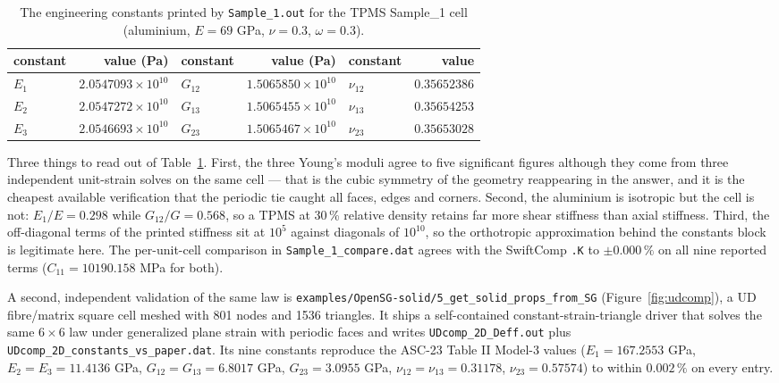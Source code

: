 \begin{table}[htbp]
\centering
\caption{The engineering constants printed by \texttt{Sample\_1.out} for the
TPMS Sample\_1 cell (aluminium, $E = 69$ GPa, $\nu = 0.3$, $\omega = 0.3$).}
\label{tab:tpmsconst}
\small
\begin{tabular}{lrlrlr}
\toprule
constant & value (Pa) & constant & value (Pa) & constant & value \\
\midrule
$E_1$ & $2.0547093\times10^{10}$ & $G_{12}$ & $1.5065850\times10^{10}$ & $\nu_{12}$ & $0.35652386$ \\
$E_2$ & $2.0547272\times10^{10}$ & $G_{13}$ & $1.5065455\times10^{10}$ & $\nu_{13}$ & $0.35654253$ \\
$E_3$ & $2.0546693\times10^{10}$ & $G_{23}$ & $1.5065467\times10^{10}$ & $\nu_{23}$ & $0.35653028$ \\
\bottomrule
\end{tabular}
\end{table}

Three things to read out of Table~\ref{tab:tpmsconst}. First, the three Young's
moduli agree to five significant figures although they come from three
independent unit-strain solves on the same cell --- that is the cubic symmetry
of the geometry reappearing in the answer, and it is the cheapest available
verification that the periodic tie caught all faces, edges and corners.
Second, the aluminium is isotropic but the cell is not: $E_1/E = 0.298$ while
$G_{12}/G = 0.568$, so a TPMS at 30\,\% relative density retains far more shear
stiffness than axial stiffness. Third, the off-diagonal terms of the printed
stiffness sit at $10^{5}$ against diagonals of $10^{10}$, so the orthotropic
approximation behind the constants block is legitimate here. The
per-unit-cell comparison in \texttt{Sample\_1\_compare.dat} agrees with the
SwiftComp \texttt{.K} to $\pm 0.000\,\%$ on all nine reported terms
($C_{11} = 10190.158$ MPa for both).

A second, independent validation of the same law is
\texttt{examples/OpenSG-solid/5\_get\_solid\_props\_from\_SG}
(Figure~\ref{fig:udcomp}), a UD fibre/matrix square cell meshed with 801 nodes
and 1536 triangles. It ships a self-contained constant-strain-triangle driver
that solves the same $6\times6$ law under generalized plane strain with periodic
faces and writes \texttt{UDcomp\_2D\_Deff.out} plus
\texttt{UDcomp\_2D\_constants\_vs\_paper.dat}. Its nine constants reproduce the
ASC-23 Table II Model-3 values ($E_1 = 167.2553$ GPa, $E_2 = E_3 = 11.4136$
GPa, $G_{12} = G_{13} = 6.8017$ GPa, $G_{23} = 3.0955$ GPa,
$\nu_{12} = \nu_{13} = 0.31178$, $\nu_{23} = 0.57574$) to within
$0.002\,\%$ on every entry.

